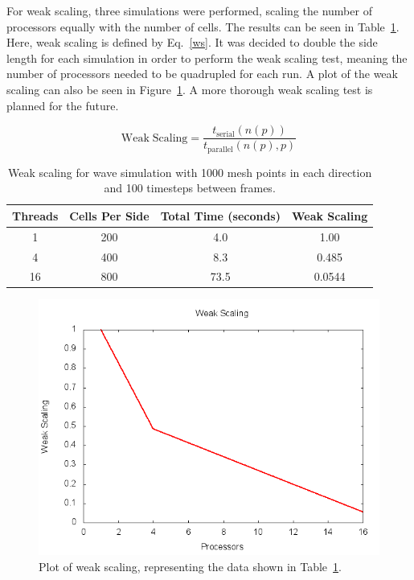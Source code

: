 \documentclass[12pt]{article}
\begin{document}
For weak scaling, three simulations were performed, scaling the number of processors equally with the number of cells. The results can be seen in Table~\ref{wstable}. Here, weak scaling is defined by Eq.~\ref{ws}. It was decided to double the side length for each simulation in order to perform the weak scaling test, meaning the number of processors needed to be quadrupled for each run. A plot of the weak scaling can also be seen in Figure~\ref{wsplot}. A more thorough weak scaling test is planned for the future.

\begin{equation}
\mathrm{Weak \; Scaling} = \frac{t_{\mathrm{serial}}(n(p))}{t_{\mathrm{parallel}}(n(p),p)}
\label{ws}
\end{equation}

\begin{table}[h]
	\begin{center}
		\begin{tabular}{|c c c c|}
			\hline
			Threads & Cells Per Side & Total Time (seconds) & Weak Scaling \\ \hline
			1 & 200 & 4.0 & 1.00   \\ \hline
			4 & 400 & 8.3 & 0.485 \\ \hline
			16 & 800 & 73.5 & 0.0544   \\ \hline
		\end{tabular}
		\caption{Weak scaling for wave simulation with 1000 mesh points in each direction and 100 timesteps between frames.}
		\label{wstable}
	\end{center}
\end{table}

		\begin{figure}[h]
			\begin{center}
				\includegraphics[width=0.5\columnwidth]{wsplot}
				\caption{Plot of weak scaling, representing the data shown in Table~\ref{wstable}.}
				\label{wsplot}
			\end{center}
		\end{figure}
\end{document}
